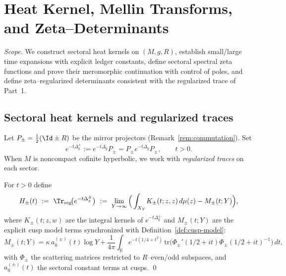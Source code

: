 
\section{Heat Kernel, Mellin Transforms, and Zeta–Determinants}
\label{sec:ch6-part2-heat-zeta} \relax \hspace{0pt}
\FlowBreaker
\noindent\emph{Scope.} We construct sectoral heat kernels on $(M,g,R)$, establish small/large time expansions with explicit ledger constants, define sectoral spectral zeta functions and prove their meromorphic continuation with control of poles, and define zeta–regularized determinants consistent with the regularized trace of Part~1. %


\subsection{Sectoral heat kernels and regularized traces}
\label{subsec:ch6-part2-heat-sector} \relax \hspace{0pt}
Let $P_\pm=\tfrac12(\Id\pm R)$ be the mirror projectors (Remark~\ref{rem:commutation}). Set
\[
e^{-t\Delta_g^{\pm}}:=e^{-t\Delta_g}P_\pm=P_\pm e^{-t\Delta_g}P_\pm,\qquad t>0.
\]
When $M$ is noncompact cofinite hyperbolic, we work with \emph{regularized traces} on each sector. %

\begin{definition}
\label{def:heat-regularized}
For $t>0$ define
\[
H_\pm(t)\ :=\ \Tr_{\mathrm{reg}}\!\big(e^{-t\Delta_g^{\pm}}\big)
\ :=\ \lim_{Y\to\infty}\Big(\int_{X_Y}\!K_\pm(t;z,z)\,d\mu(z)-M_\pm(t;Y)\Big),
\]
where $K_\pm(t;z,w)$ are the integral kernels of $e^{-t\Delta_g^\pm}$ and $M_\pm(t;Y)$ are the explicit cusp model terms synchronized with Definition~\ref{def:cusp-model}:
\[
M_\pm(t;Y)=\kappa\,a_0^{(\pm)}(t)\log Y+\frac{1}{4\pi}\!\int_{\mathbb R}\! e^{-t(1/4+t^2)}\,\mathrm{tr}\!\big(\Phi_\pm'(1/2+it)\Phi_\pm(1/2+it)^{-1}\big)\,dt,
\]
with $\Phi_\pm$ the scattering matrices restricted to $R$–even/odd subspaces, and $a_0^{(\pm)}(t)$ the sectoral constant terms at cusps. \qed
\end{definition}

